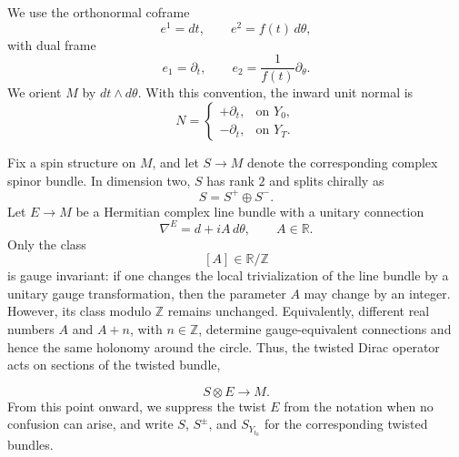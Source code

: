 \documentclass[11pt]{article}
\theoremstyle{definition}
\numberwithin{equation}{section}
\begin{document}
We use the orthonormal coframe
\begin{equation}\label{eq:coframe}
e^1=dt,
\qquad
e^2=f(t)\,d\theta,
\end{equation}
with dual frame
\begin{equation}\label{eq:dual_frame}
e_1=\partial_t,
\qquad
e_2=\frac{1}{f(t)}\partial_\theta.
\end{equation}
We orient \(M\) by \(dt\wedge d\theta\). With this convention, the inward unit normal is
\begin{equation}\label{eq:inward_normal}
N=
\begin{cases}
+\partial_t,& \text{on }Y_0,\\
-\partial_t,& \text{on }Y_T.
\end{cases}
\end{equation}

Fix a spin structure on \(M\), and let $S\to M$ denote the corresponding complex spinor bundle. In dimension two, \(S\) has rank \(2\) and splits chirally as
\begin{equation}\label{eq:chirality_split}
S=S^+\oplus S^-.
\end{equation}
Let \(E\to M\) be a Hermitian complex line bundle with a unitary connection
\begin{equation}\label{eq:connectionE}
\nabla^E=d+iA\,d\theta,
\qquad
A\in\mathbb R.
\end{equation}
Only the class
\begin{equation}\label{eq:A_class}
[A]\in \mathbb R/\mathbb Z
\end{equation}
is gauge invariant: if one changes the local trivialization of the line bundle by a unitary gauge transformation, then the parameter \(A\) may change by an integer. However, its class modulo \(\mathbb Z\) remains unchanged. Equivalently, different real numbers \(A\) and \(A+n\), with \(n\in\mathbb Z\), determine gauge-equivalent connections and hence the same holonomy around the circle. Thus, the twisted Dirac operator acts on sections of the twisted bundle,

\begin{equation}\label{eq:twisted_bundle}
S\otimes E\to M.
\end{equation}
From this point onward, we suppress the twist \(E\) from the notation when no confusion can arise, and write \(S\), \(S^\pm\), and \(S_{Y_{t_0}}\) for the corresponding twisted bundles.
\end{document}
